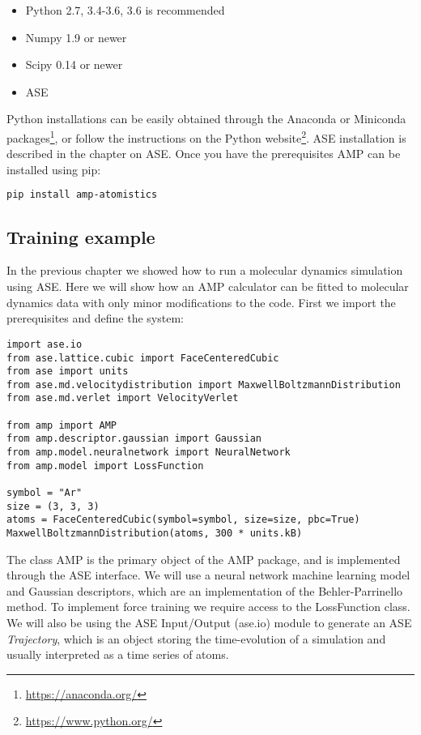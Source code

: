 \begin{itemize}
    \item Python 2.7, 3.4-3.6, 3.6 is recommended
    \item Numpy 1.9 or newer
    \item Scipy 0.14 or newer
    \item ASE
\end{itemize}

Python installations can be easily obtained through the Anaconda 
or Miniconda packages\footnote{\url{https://anaconda.org/}},
or follow the instructions on the Python website\footnote{
\url{https://www.python.org/}}.
ASE installation is described in the chapter on ASE.
Once you have the prerequisites AMP can be installed using pip:

\begin{lstlisting}[language=bash]
pip install amp-atomistics
\end{lstlisting}

\subsection{Training example}
In the previous chapter we showed how to run a molecular dynamics
simulation using ASE. Here we will show how an AMP calculator
can be fitted to molecular dynamics data with only minor
modifications to the code.
First we import the prerequisites and define the system:

\begin{verbatim}
import ase.io
from ase.lattice.cubic import FaceCenteredCubic
from ase import units
from ase.md.velocitydistribution import MaxwellBoltzmannDistribution
from ase.md.verlet import VelocityVerlet

from amp import AMP
from amp.descriptor.gaussian import Gaussian
from amp.model.neuralnetwork import NeuralNetwork
from amp.model import LossFunction

symbol = "Ar"
size = (3, 3, 3)
atoms = FaceCenteredCubic(symbol=symbol, size=size, pbc=True)
MaxwellBoltzmannDistribution(atoms, 300 * units.kB)
\end{verbatim}

The class AMP is the primary object of the AMP package,
and is implemented through the ASE interface.
We will use a neural network machine learning model
and Gaussian descriptors, which are an implementation of the
Behler-Parrinello method. To implement force training we require
access to the LossFunction class.
We will also be using the ASE Input/Output (ase.io) module to generate an
ASE \textit{Trajectory}, which is an object
storing the time-evolution of a simulation and usually interpreted
as a time series of atoms.

